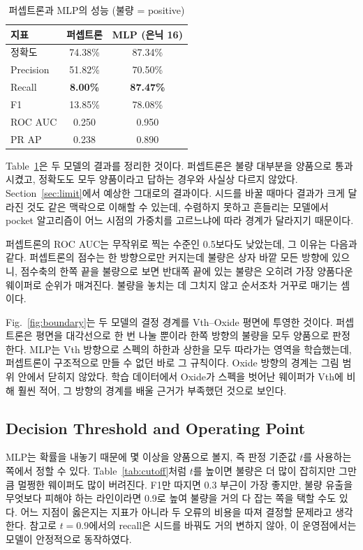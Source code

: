 \documentclass[10pt,twocolumn,a4paper]{article}
\begin{document}
\begin{table}[t]
\centering\small
\caption{퍼셉트론과 MLP의 성능 (불량 = positive)}
\label{tab:main}
\begin{tabular}{lcc}
\toprule
지표 & 퍼셉트론 & MLP (은닉 16) \\
\midrule
정확도    & 74.38\% & 87.34\% \\
Precision & 51.82\% & 70.50\% \\
Recall    & \textbf{8.00\%} & \textbf{87.47\%} \\
F1        & 13.85\% & 78.08\% \\
ROC AUC   & 0.250 & 0.950 \\
PR AP     & 0.238 & 0.890 \\
\bottomrule
\end{tabular}
\end{table}

Table~\ref{tab:main}은 두 모델의 결과를 정리한 것이다. 퍼셉트론은 불량 대부분을 양품으로
통과시켰고, 정확도도 모두 양품이라고 답하는 경우와 사실상 다르지 않았다. Section~\ref{sec:limit}에서 예상한
그대로의 결과이다. 시드를 바꿀 때마다 결과가 크게 달라진 것도 같은 맥락으로 이해할 수 있는데,
수렴하지 못하고 흔들리는 모델에서 pocket 알고리즘이 어느 시점의 가중치를 고르느냐에 따라
경계가 달라지기 때문이다.

퍼셉트론의 ROC AUC는 무작위로 찍는 수준인 0.5보다도 낮았는데, 그 이유는 다음과 같다.
퍼셉트론의 점수는 한 방향으로만 커지는데 불량은 상자 바깥 모든 방향에 있으니, 점수축의 한쪽
끝을 불량으로 보면 반대쪽 끝에 있는 불량은 오히려 가장 양품다운 웨이퍼로 순위가 매겨진다.
불량을 놓치는 데 그치지 않고 순서조차 거꾸로 매기는 셈이다.

Fig.~\ref{fig:boundary}는 두 모델의 결정 경계를 Vth--Oxide 평면에 투영한 것이다. 퍼셉트론은
평면을 대각선으로 한 번 나눌 뿐이라 한쪽 방향의 불량을 모두 양품으로 판정한다. MLP는 Vth
방향으로 스펙의 하한과 상한을 모두 따라가는 영역을 학습했는데, 퍼셉트론이 구조적으로 만들 수
없던 바로 그 규칙이다. Oxide 방향의 경계는 그림 범위 안에서 닫히지 않았다. 학습 데이터에서
Oxide가 스펙을 벗어난 웨이퍼가 Vth에 비해 훨씬 적어, 그 방향의 경계를 배울 근거가 부족했던
것으로 보인다.

\subsection{Decision Threshold and Operating Point}

MLP는 확률을 내놓기 때문에 몇 이상을 양품으로 볼지, 즉 판정 기준값 $t$를 사용하는 쪽에서
정할 수 있다. Table~\ref{tab:cutoff}처럼 $t$를 높이면 불량은 더 많이 잡히지만 그만큼 멀쩡한
웨이퍼도 많이 버려진다. F1만 따지면 0.3 부근이 가장 좋지만, 불량 유출을 무엇보다 피해야 하는
라인이라면 0.9로 높여 불량을 거의 다 잡는 쪽을 택할 수도 있다. 어느 지점이 옳은지는 지표가
아니라 두 오류의 비용을 따져 결정할 문제라고 생각한다. 참고로 $t = 0.9$에서의 recall은
시드를 바꿔도 거의 변하지 않아, 이 운영점에서는 모델이 안정적으로 동작하였다.
\end{document}
